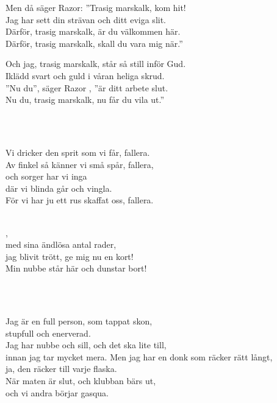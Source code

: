Men då säger Razor: ”Trasig marskalk, kom hit!\\
Jag har sett din strävan och ditt eviga slit.\\
Därför, trasig marskalk, är du välkommen här.\\
Därför, trasig marskalk, skall du vara mig när.”

Och jag, trasig marskalk, står så still inför Gud.\\
Iklädd svart och guld i våran heliga skrud.\\
”Nu du”, säger Razor , ”är ditt arbete slut.\\
Nu du, trasig marskalk, nu får du vila ut.”

 \\


 \\       
\author{Text: Janne Weijnitz }

\songtext{}Vi dricker den sprit som vi får, fallera.\\
Av finkel så känner vi små spår, fallera,\\
och sorger har vi inga\\
där vi blinda går och vingla.\\
För vi har ju ett rus skaffat oss, fallera.\\


 \\       
\author{Text: CAlle Almquist}

,\\
med sina ändlösa antal rader,\\
jag blivit trött, ge mig nu en kort!\\
Min nubbe står här och dunstar bort!

\\

 \\       

\songtext{} 
Jag är en full person, som tappat skon,\\ 
stupfull och enerverad.\\ 
Jag har nubbe och sill, och det ska lite till,\\ 
innan jag tar mycket mera.
\newpage
Men jag har en donk som räcker rätt långt,\\ 
ja, den räcker till varje flaska.\\ 
När maten är slut, och klubban bärs ut,\\ 
och vi andra börjar gasqua. 

